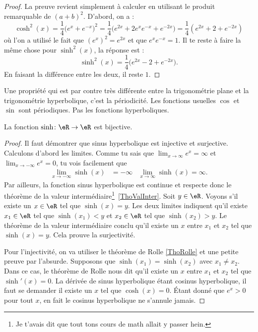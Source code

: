 \begin{proof}
La preuve revient simplement à calculer en utilisant le produit remarquable de $(a+b)^2$. D'abord, on a :
\[
  \cosh^2(x)=\frac{1}{ 4 }\big(  e^{x}+ e^{-x} \big)^2=\frac{1}{ 4 }\big(  e^{2x}+2 e^{x} e^{-x}+ e^{-2x} \big)=\frac{1}{ 4 }( e^{2x}+2+ e^{-2x})
\]
où l'on a utilisé le fait que $(e^{x})^2= e^{2x}$ et que $ e^{x} e^{-x}=1$. Il te reste à faire la même chose pour $\sinh^2(x)$, la réponse est :
\[
  \sinh^2(x)=\frac{1}{ 4 }\big(  e^{2x}-2+ e^{-2x} \big).
\]
En faisant la différence entre les deux, il reste $1$.
\end{proof}
Une propriété qui est par contre très différente entre la trigonométrie plane et la trigonométrie hyperbolique, c'est la périodicité. Les fonctions usuelles $\cos$ et $\sin$ sont périodiques. Pas les fonctions hyperboliques.

\begin{proposition}
La fonction $\sinh\colon \eR\to\eR $ est bijective.
\end{proposition}

\begin{proof}
Il faut démontrer que sinus hyperbolique est injective et surjective. Calculons d'abord les limites. Comme tu sais que $\lim_{x\to\infty} e^{x}=\infty$ et $\lim_{x\to-\infty} e^{x}=0$, tu vois facilement que
\begin{align}
\lim_{x\to-\infty}\sinh(x)&=-\infty	&\lim_{x\to\infty}\sinh(x)=\infty.
\end{align}
Par ailleurs, la fonction sinus hyperbolique est continue et respecte donc le théorème de la valeur intermédiaire\footnote{Je t'avais dit que tout tons cours de math allait y passer hein.}~\ref{ThoValInter}. Soit $y\in\eR$. Voyons s'il existe un $x\in\eR$ tel que $\sinh(x)=y$. Les deux limites indiquent qu'il existe $x_1\in\eR$ tel que $\sinh(x_1)<y$ et $x_2\in\eR$ tel que $\sinh(x_2)>y$. Le théorème de la valeur intermédiaire conclu qu'il existe un $x$ entre $x_1$ et $x_2$ tel que $\sinh(x)=y$. Cela prouve la surjectivité.

Pour l'injectivité, on va utiliser le théorème de Rolle \ref{ThoRolle} et une petite preuve par l'absurde. Supposons que $\sinh(x_1)=\sinh(x_2)$ avec $x_1\neq x_2$. Dans ce cas, le théorème de Rolle nous dit qu'il existe un $x$ entre $x_1$ et $x_2$ tel que $\sinh'(x)=0$. La dérivée de sinus hyperbolique étant cosinus hyperbolique, il faut se demander il existe un $x$ tel que $\cosh(x)=0$. Étant donné que $ e^{x}>0$ pour tout $x$, en fait le cosinus hyperbolique ne s'annule jamais.
\end{proof}

